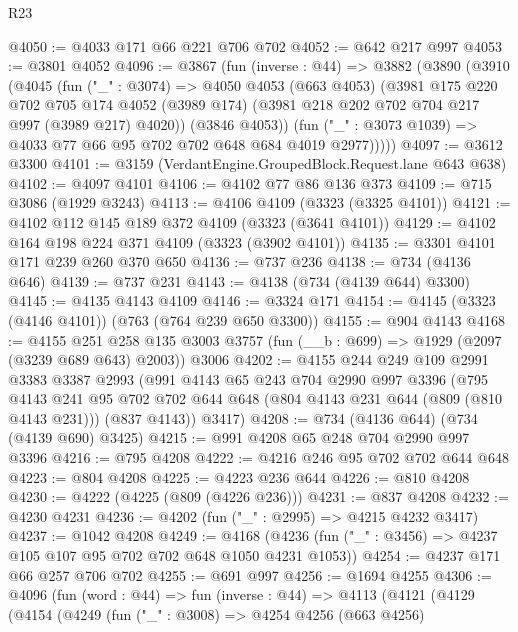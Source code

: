 \begin{lexlean}{R23}
\begin{coremodule}
@4050 := @4033 @171 @66 @221 @706 @702
@4052 := @642 @217 @997
@4053 := @3801 @4052
@4096 := @3867
    (fun (inverse : @44) =>
    @3882
      (@3890
        (@3910
          (@4045
            (fun ("_" : @3074) =>
            @4050
              @4053
              (@663 @4053)
              (@3981
                @175
                @220
                @702
                @705
                @174
                @4052
                (@3989 @174)
                (@3981 @218 @202 @702 @704 @217 @997 (@3989 @217) @4020))
              (@3846 @4053))
            (fun ("_" : @3073 @1039) => @4033 @77 @66 @95 @702 @702 @648 @684 @4019 @2977)))))
@4097 := @3612 @3300
@4101 := @3159 (VerdantEngine.GroupedBlock.Request.lane @643 @638)
@4102 := @4097 @4101
@4106 := @4102 @77 @86 @136 @373
@4109 := @715 @3086 (@1929 @3243)
@4113 := @4106 @4109 (@3323 (@3325 @4101))
@4121 := @4102 @112 @145 @189 @372 @4109 (@3323 (@3641 @4101))
@4129 := @4102 @164 @198 @224 @371 @4109 (@3323 (@3902 @4101))
@4135 := @3301 @4101 @171 @239 @260 @370 @650
@4136 := @737 @236
@4138 := @734 (@4136 @646)
@4139 := @737 @231
@4143 := @4138 (@734 (@4139 @644) @3300)
@4145 := @4135 @4143 @4109
@4146 := @3324 @171
@4154 := @4145 (@3323 (@4146 @4101)) (@763 (@764 @239 @650 @3300))
@4155 := @904 @4143
@4168 := @4155
    @251
    @258
    @135
    @3003
    @3757
    (fun (__b : @699) => @1929 (@2097 (@3239 @689 @643) @2003))
    @3006
@4202 := @4155
    @244
    @249
    @109
    @2991
    @3383
    @3387
    @2993
    (@991
      @4143
      @65
      @243
      @704
      @2990
      @997
      @3396
      (@795
        @4143
        @241
        @95
        @702
        @702
        @644
        @648
        (@804 @4143 @231 @644 (@809 (@810 @4143 @231)))
        (@837 @4143))
      @3417)
@4208 := @734 (@4136 @644) (@734 (@4139 @690) @3425)
@4215 := @991 @4208 @65 @248 @704 @2990 @997 @3396
@4216 := @795 @4208
@4222 := @4216 @246 @95 @702 @702 @644 @648
@4223 := @804 @4208
@4225 := @4223 @236 @644
@4226 := @810 @4208
@4230 := @4222 (@4225 (@809 (@4226 @236)))
@4231 := @837 @4208
@4232 := @4230 @4231
@4236 := @4202 (fun ("_" : @2995) => @4215 @4232 @3417)
@4237 := @1042 @4208
@4249 := @4168 (@4236 (fun ("_" : @3456) => @4237 @105 @107 @95 @702 @702 @648 @1050 @4231 @1053))
@4254 := @4237 @171 @66 @257 @706 @702
@4255 := @691 @997
@4256 := @1694 @4255
@4306 := @4096
    (fun (word : @44) =>
    fun (inverse : @44) =>
    @4113
      (@4121
        (@4129
          (@4154
            (@4249
              (fun ("_" : @3008) =>
              @4254
                @4256
                (@663 @4256)

\end{coremodule}
\end{lexlean}
